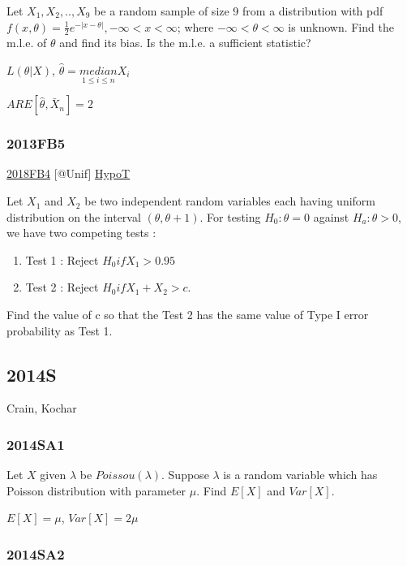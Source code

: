 \documentclass[10pt,twocolumn,portrait]{article}
\begin{document}
Let \(X_1,X_2,..,X_9\) be a random sample of size 9 from a distribution
with pdf \(f(x,\theta) =\frac12e^{-|x-\theta|}, -\infty<x<\infty\);
where \(-\infty<\theta<\infty\) is unknown. Find the m.l.e. of
\(\theta\) and find its bias. Is the m.l.e. a sufficient statistic?

\(L(\theta|X)\), \(\hat\theta=\underset{1\le i\le n}{median} X_i\)

\(ARE[\hat\theta,\bar X_n]=2\)

\hypertarget{fb5}{%
\subsubsection{2013FB5}\label{fb5}}

\protect\hyperlink{fb4-4}{2018FB4} {[}@Unif{]}
\protect\hyperlink{HypoT}{HypoT}

Let \(X_1\) and \(X_2\) be two independent random variables each having
uniform distribution on the interval \((\theta,\theta+1)\). For testing
\(H_0:\theta=0\) against \(H_a:\theta> 0\), we have two competing tests
:

\begin{enumerate}
\def\labelenumi{\arabic{enumi}.}
\item
  Test 1 : Reject \(H_0 if X_1>0.95\)
\item
  Test 2 : Reject \(H_0 if X_1+X_2>c\).
\end{enumerate}

Find the value of c so that the Test 2 has the same value of Type I
error probability as Test 1.

\hypertarget{s-7}{%
\subsection{2014S}\label{s-7}}

Crain, Kochar

\hypertarget{sa1-2}{%
\subsubsection{2014SA1}\label{sa1-2}}

Let \(X\) given \(\lambda\) be \(Poissou(\lambda)\). Suppose \(\lambda\)
is a random variable which has Poisson distribution with parameter
\(\mu\). Find \(E[X]\) and \(Var[X]\).

\(E[X]=\mu\), \(Var[X]=2\mu\)

\hypertarget{sa2-2}{%
\subsubsection{2014SA2}\label{sa2-2}}
\end{document}
